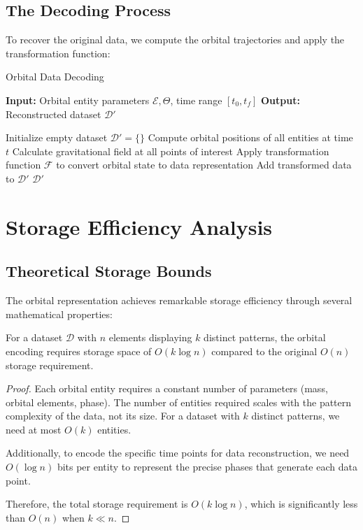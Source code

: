 \subsection{The Decoding Process}

To recover the original data, we compute the orbital trajectories and apply the transformation function:

\begin{algorithm}[h]
\caption{Orbital Data Decoding}
\begin{algorithmic}[1]
\State \textbf{Input:} Orbital entity parameters $\mathcal{E}, \Theta$, time range $[t_0, t_f]$
\State \textbf{Output:} Reconstructed dataset $\mathcal{D'}$

\State Initialize empty dataset $\mathcal{D'} = \{\}$
  \State Compute orbital positions of all entities at time $t$
  \State Calculate gravitational field at all points of interest
  \State Apply transformation function $\mathcal{F}$ to convert orbital state to data representation
  \State Add transformed data to $\mathcal{D'}$
\EndFor
\State \Return $\mathcal{D'}$
\end{algorithmic}
\end{algorithm}

\section{Storage Efficiency Analysis}

\subsection{Theoretical Storage Bounds}

The orbital representation achieves remarkable storage efficiency through several mathematical properties:

\begin{theorem}
For a dataset $\mathcal{D}$ with $n$ elements displaying $k$ distinct patterns, the orbital encoding requires storage space of $O(k \log n)$ compared to the original $O(n)$ storage requirement.
\end{theorem}

\begin{proof}
Each orbital entity requires a constant number of parameters (mass, orbital elements, phase). The number of entities required scales with the pattern complexity of the data, not its size. For a dataset with $k$ distinct patterns, we need at most $O(k)$ entities.

Additionally, to encode the specific time points for data reconstruction, we need $O(\log n)$ bits per entity to represent the precise phases that generate each data point.

Therefore, the total storage requirement is $O(k \log n)$, which is significantly less than $O(n)$ when $k \ll n$.
\end{proof}

